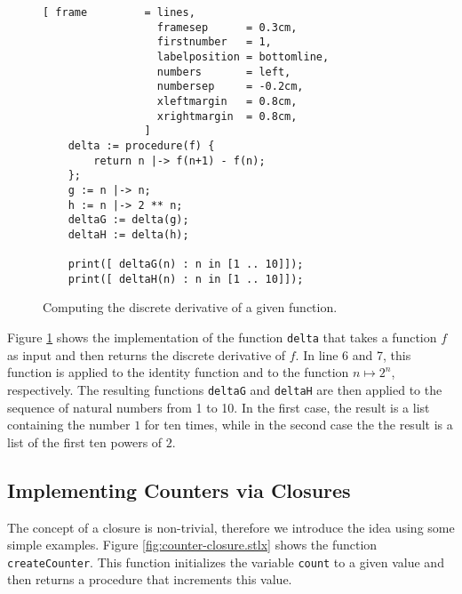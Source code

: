 \begin{figure}[!ht]
\centering
\begin{Verbatim}[ frame         = lines, 
                  framesep      = 0.3cm, 
                  firstnumber   = 1,
                  labelposition = bottomline,
                  numbers       = left,
                  numbersep     = -0.2cm,
                  xleftmargin   = 0.8cm,
                  xrightmargin  = 0.8cm,
                ]
    delta := procedure(f) {
        return n |-> f(n+1) - f(n);
    };    
    g := n |-> n;
    h := n |-> 2 ** n;
    deltaG := delta(g);
    deltaH := delta(h);
    
    print([ deltaG(n) : n in [1 .. 10]]);
    print([ deltaH(n) : n in [1 .. 10]]);
\end{Verbatim}
\vspace*{-0.3cm}
\caption{Computing the discrete derivative of a given function.}
\label{fig:finite-difference.stlx}
\end{figure}

\noindent
Figure \ref{fig:finite-difference.stlx} shows the implementation of the function \texttt{delta}
that takes a function $f$ as input and then returns the discrete derivative of $f$.  In line 6
and 7, this function is applied to the identity function and to the function $n \mapsto 2^n$,
respectively.  The resulting functions \texttt{deltaG} and \texttt{deltaH} are then applied to
the sequence of natural numbers from 1 to 10.  In the first case, the result is a list
containing the number $1$ for ten times, while in the second case the the result is a list of the
first ten powers of $2$.


\subsection{Implementing Counters via Closures}
The concept of a closure is non-trivial, therefore we introduce the idea using some simple
examples.  Figure \ref{fig:counter-closure.stlx} shows the function
\texttt{createCounter}.  This function initializes the variable \texttt{count} to a given
value and then returns a procedure that increments this value.  

